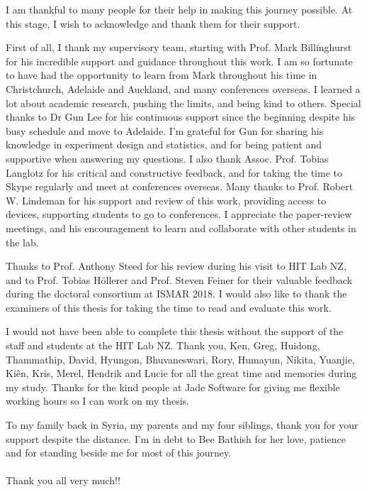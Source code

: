 \begin{acknowledgements}
\addchaptertocentry{\acknowledgementname} %

I am thankful to many people for their help in making this journey possible. At this stage, I wish to acknowledge and thank them for their support. 

First of all, I thank my supervisory team, starting with Prof. Mark Billinghurst for his incredible support and guidance throughout this work. I am so fortunate to have had the opportunity to learn from Mark throughout his time in Christchurch, Adelaide and Auckland, and many conferences overseas. I learned a lot about academic research, pushing the limits, and being kind to others. 
Special thanks to Dr Gun Lee for his continuous support since the beginning despite his busy schedule and move to Adelaide. I'm grateful for Gun for sharing his knowledge in experiment design and statistics, and for being patient and supportive when answering my questions. 
I also thank Assoc. Prof. Tobias Langlotz for his critical and constructive feedback, and for taking the time to Skype regularly and meet at conferences overseas.
Many thanks to Prof. Robert W. Lindeman for his support and review of this work, providing access to devices, supporting students to go to conferences. I appreciate the paper-review meetings, and his encouragement to learn and collaborate with other students in the lab. 

Thanks to Prof. Anthony Steed for his review during his visit to HIT Lab NZ, and to Prof. Tobias Höllerer and Prof. Steven Feiner for their valuable feedback during the doctoral consortium at ISMAR 2018. I would also like to thank the examiners of this thesis for taking the time to read and evaluate this work. 

I would not have been able to complete this thesis without the support of the staff and students at the HIT Lab NZ. Thank you, Ken, Greg, Huidong, Thammathip, David, Hyungon, Bhuvaneswari, Rory, Humayun, Nikita, Yuanjie, Kiên, Kris, Merel, Hendrik and Lucie for all the great time and memories during my study. Thanks for the kind people at Jade Software for giving me flexible working hours so I can work on my thesis.

To my family back in Syria, my parents and my four siblings, thank you for your support despite the distance. I'm in debt to Bee Bathish for her love, patience and for standing beside me for most of this journey. 
\\
\\
Thank you all very much!!

\end{acknowledgements}